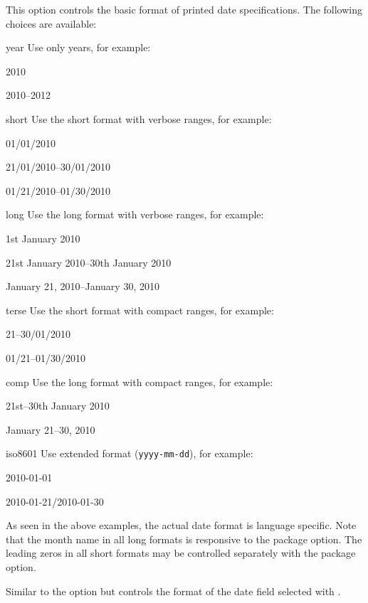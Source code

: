 \documentclass{ltxdockit}[2011/03/25]
\begin{document}
\begin{optionlist}

This option controls the basic format of printed date specifications. The following choices are available:

\begin{valuelist}
\item[year] Use only years, for example:\par
2010\par
2010--2012\par
\item[short] Use the short format with verbose ranges, for example:\par
01/01/2010\par
21/01/2010--30/01/2010\par
01/21/2010--01/30/2010
\item[long] Use the long format with verbose ranges, for example:\par
1st January 2010\par
21st January 2010--30th January 2010\par
January 21, 2010--January 30, 2010\par
\item[terse] Use the short format with compact ranges, for example:\par
21--30/01/2010\par
01/21--01/30/2010
\item[comp] Use the long format with compact ranges, for example:\par
21st--30th January 2010\par
January 21--30, 2010\par
\item[iso8601] Use extended  format (\texttt{yyyy-mm-dd}), for example:\par
2010-01-01\par
2010-01-21/2010-01-30
\end{valuelist}
%
As seen in the above examples, the actual date format is language specific. Note that the month name in all long formats is responsive to the  package option. The leading zeros in all short formats may be controlled separately with the  package option.


Similar to the  option but controls the format of the date field selected with .


\end{optionlist}
\end{document}
